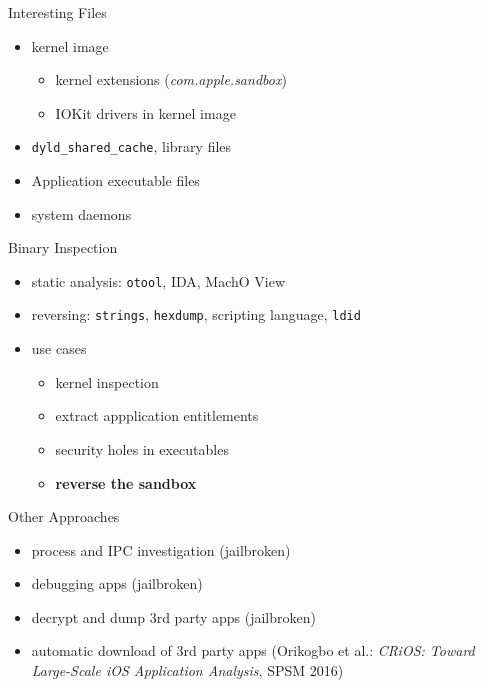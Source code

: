 \documentclass{beamer}
\begin{document}
\begin{frame}{Interesting Files}
  \begin{itemize}
    \pause \item kernel image
      \begin{itemize}
        \item kernel extensions (\textit{com.apple.sandbox})
        \item IOKit drivers in kernel image
      \end{itemize}
    \item \texttt{dyld_shared_cache}, library files
    \item Application executable files
    \item system daemons
  \end{itemize}
\end{frame}

\begin{frame}{Binary Inspection}
  \begin{itemize}
    \item static analysis: \texttt{otool}, IDA, MachO View
    \item reversing: \texttt{strings}, \texttt{hexdump}, scripting language, \texttt{ldid}
    \item use cases
      \begin{itemize}
        \item kernel inspection
        \item extract appplication entitlements
        \item security holes in executables
        \item \textbf{reverse the sandbox}
      \end{itemize}
  \end{itemize}
\end{frame}

\begin{frame}{Other Approaches}
  \begin{itemize}
    \item process and IPC investigation (jailbroken)
    \item debugging apps (jailbroken)
    \item decrypt and dump 3rd party apps (jailbroken)
    \item automatic download of 3rd party apps (Orikogbo et al.: \textit{CRiOS: Toward Large-Scale iOS Application Analysis}, SPSM 2016)
  \end{itemize}
\end{frame}
\end{document}
